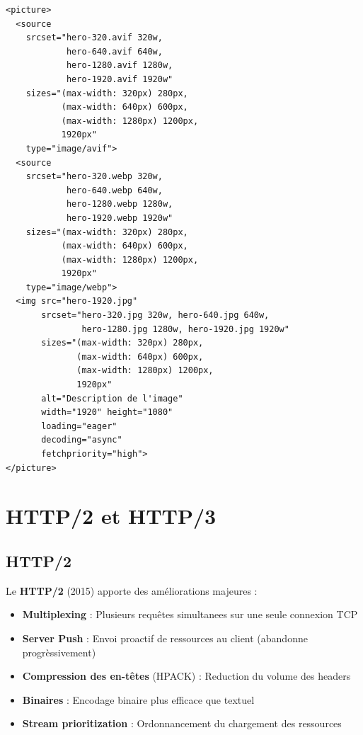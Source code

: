 \documentclass[12pt,a4paper,twoside]{report}
\newcommand{\keyword}[1]{\textbf{\textcolor{googleblue}{#1}}}
\begin{document}
\begin{lstlisting}[style=htmlcode,caption={Balise picture avec fallback et srcset optimisé}]
<picture>
  <source
    srcset="hero-320.avif 320w,
            hero-640.avif 640w,
            hero-1280.avif 1280w,
            hero-1920.avif 1920w"
    sizes="(max-width: 320px) 280px,
           (max-width: 640px) 600px,
           (max-width: 1280px) 1200px,
           1920px"
    type="image/avif">
  <source
    srcset="hero-320.webp 320w,
            hero-640.webp 640w,
            hero-1280.webp 1280w,
            hero-1920.webp 1920w"
    sizes="(max-width: 320px) 280px,
           (max-width: 640px) 600px,
           (max-width: 1280px) 1200px,
           1920px"
    type="image/webp">
  <img src="hero-1920.jpg"
       srcset="hero-320.jpg 320w, hero-640.jpg 640w,
               hero-1280.jpg 1280w, hero-1920.jpg 1920w"
       sizes="(max-width: 320px) 280px,
              (max-width: 640px) 600px,
              (max-width: 1280px) 1200px,
              1920px"
       alt="Description de l'image"
       width="1920" height="1080"
       loading="eager"
       decoding="async"
       fetchpriority="high">
</picture>
\end{lstlisting}

\section{HTTP/2 et HTTP/3}

\subsection{HTTP/2}

Le \keyword{HTTP/2} (2015) apporte des améliorations majeures :

\begin{itemize}
    \item \textbf{Multiplexing} : Plusieurs requêtes simultanees sur une seule connexion TCP
    \item \textbf{Server Push} : Envoi proactif de ressources au client (abandonne progrèssivement)
    \item \textbf{Compression des en-têtes} (HPACK) : Reduction du volume des headers
    \item \textbf{Binaires} : Encodage binaire plus efficace que textuel
    \item \textbf{Stream prioritization} : Ordonnancement du chargement des ressources
\end{itemize}
\end{document}
